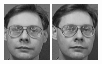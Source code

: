 \begin{figure}[ht]
 \includegraphics[width=\columnwidth/11]{ch3/figures/s4_1.png}
 \includegraphics[width=\columnwidth/11]{ch3/figures/s4_2.png}

\end{figure}
